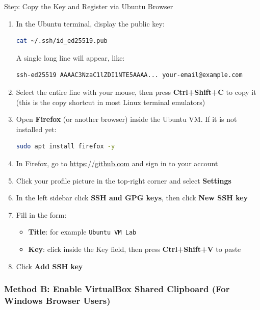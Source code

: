 \documentclass[
    a4paper,
    11pt,
    parskip=half
]{scrartcl}
\begin{document}
\begin{stepbox}{Step: Copy the Key and Register via Ubuntu Browser}
\begin{enumerate}
    \item In the Ubuntu terminal, display the public key:
\begin{lstlisting}[language=bash]
cat ~/.ssh/id_ed25519.pub
\end{lstlisting}
    A single long line will appear, like:
\begin{lstlisting}
ssh-ed25519 AAAAC3NzaC1lZDI1NTE5AAAA... your-email@example.com
\end{lstlisting}

    \item Select the entire line with your mouse, then press \textbf{Ctrl+Shift+C} to copy it (this is the copy shortcut in most Linux terminal emulators)

    \item Open \textbf{Firefox} (or another browser) inside the Ubuntu VM. If it is not installed yet:
\begin{lstlisting}[language=bash]
sudo apt install firefox -y
\end{lstlisting}

    \item In Firefox, go to \url{https://github.com} and sign in to your account

    \item Click your profile picture in the top-right corner and select \textbf{Settings}

    \item In the left sidebar click \textbf{SSH and GPG keys}, then click \textbf{New SSH key}

    \item Fill in the form:
        \begin{itemize}
            \item \textbf{Title}: for example \texttt{Ubuntu VM Lab}
            \item \textbf{Key}: click inside the Key field, then press \textbf{Ctrl+Shift+V} to paste
        \end{itemize}

    \item Click \textbf{Add SSH key}
\end{enumerate}
\end{stepbox}

\subsubsection*{Method B: Enable VirtualBox Shared Clipboard (For Windows Browser Users)}
\end{document}
